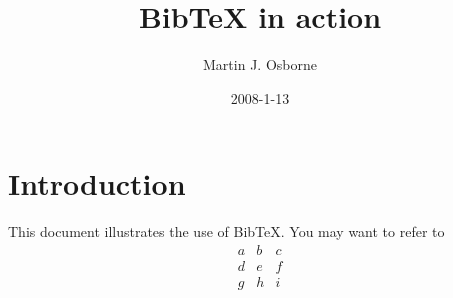 \documentclass[12pt]{article}
\begin{document}
\title{BibTeX in action}
\author{Martin J. Osborne}
\date{2008-1-13}

\maketitle

\section{Introduction}
This document illustrates the use of BibTeX\@.  You may want to refer to
\cite{LimitBound2}\cite{Win2011Network}
\cite{6237577}\cite{K2008Explicit}\cite{7962761}\cite{7887727}
\[
 \begin{matrix}
  a & b & c \\
  d & e & f \\
  g & h & i
 \end{matrix}
\]



\end{document}
